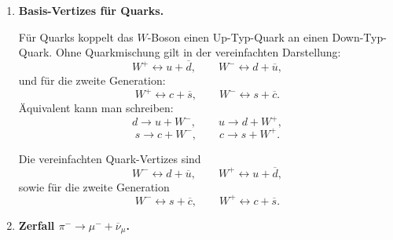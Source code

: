 \documentclass[11pt,a4paper]{scrartcl}
\newcommand{\mum}{\mu^-}
\newcommand{\numub}{\overline{\nu}_\mu}
\newcommand{\pionm}{\pi^-}
\theoremstyle{definition}
\theoremstyle{plain}
\theoremstyle{remark}
\begin{document}
\begin{enumerate}[label=(\alph*)]
    \item \textbf{Basis-Vertizes f\"ur Quarks.}

    \begin{calculationbox}
        Für Quarks koppelt das $W$-Boson einen Up-Typ-Quark an einen Down-Typ-Quark. Ohne Quarkmischung gilt in der vereinfachten Darstellung:
        \[
            W^+ \leftrightarrow u+\overline d,
            \qquad
            W^- \leftrightarrow d+\overline u,
        \]
        und für die zweite Generation:
        \[
            W^+ \leftrightarrow c+\overline s,
            \qquad
            W^- \leftrightarrow s+\overline c.
        \]
        Äquivalent kann man schreiben:
        \[
            d\to u+W^-,
            \qquad
            u\to d+W^+,
        \]
        \[
            s\to c+W^-,
            \qquad
            c\to s+W^+.
        \]
    \end{calculationbox}

    \begin{calculationbox}[title=Diagrammatische Darstellung]
    \begin{center}
    \end{center}
    \end{calculationbox}

    \begin{answerbox}
        Die vereinfachten Quark-Vertizes sind
        \[
            \boxed{W^- \leftrightarrow d+\overline u},
            \qquad
            \boxed{W^+ \leftrightarrow u+\overline d},
        \]
        sowie für die zweite Generation
        \[
            \boxed{W^- \leftrightarrow s+\overline c},
            \qquad
            \boxed{W^+ \leftrightarrow c+\overline s}.
        \]
    \end{answerbox}

    \item \textbf{Zerfall $\pionm\to\mum+\numub$.}


\end{enumerate}
\end{document}
